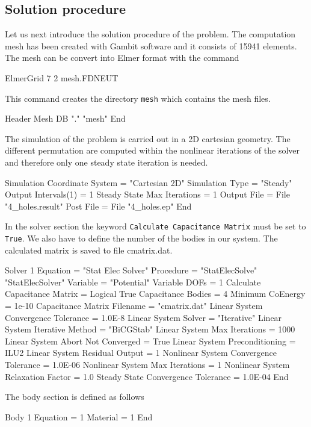 \subsection*{Solution procedure}

\begin{flushleft}
Let us next introduce the solution procedure of the problem.
The computation mesh has been created with Gambit software and it consists of 15941 elements. The mesh can be convert into Elmer format with the command

\ttbegin
ElmerGrid 7 2 mesh.FDNEUT
\ttend

This command creates the directory {\tt mesh} which contains the mesh files. 

\ttbegin
Header
  Mesh DB "." "mesh"
End
\ttend

The simulation of the problem is carried out in a 2D cartesian geometry.
The different permutation are computed within the nonlinear iterations of the solver and therefore only one
steady state iteration is needed.

\ttbegin
Simulation
  Coordinate System = "Cartesian 2D"
  Simulation Type = "Steady"
  Output Intervals(1) = 1 
  Steady State Max Iterations = 1
  Output File = File "4_holes.result"
  Post File =   File "4_holes.ep"
End
\ttend

In the solver section the keyword {\tt Calculate Capacitance Matrix} must be set to {\tt True}. 
We also have to define the number of the bodies in our system. 
The calculated matrix is saved to file cmatrix.dat.

\ttbegin
Solver 1
  Equation = "Stat Elec Solver"
  Procedure = "StatElecSolve" "StatElecSolver"
  Variable = "Potential"
  Variable DOFs = 1
  Calculate Capacitance Matrix = Logical True
  Capacitance Bodies = 4
  Minimum CoEnergy = 1e-10
  Capacitance Matrix Filename = "cmatrix.dat"
  Linear System Convergence Tolerance = 1.0E-8
  Linear System Solver = "Iterative"
  Linear System Iterative Method = "BiCGStab"
  Linear System Max Iterations = 1000
  Linear System Abort Not Converged = True
  Linear System Preconditioning = ILU2
  Linear System Residual Output = 1
  Nonlinear System Convergence Tolerance =  1.0E-06
  Nonlinear System Max Iterations = 1
  Nonlinear System Relaxation Factor = 1.0
  Steady State Convergence Tolerance =  1.0E-04
End
\ttend

The body section is defined as follows

\ttbegin
Body 1
  Equation = 1
  Material = 1
End
\ttend                                      


\end{flushleft}
